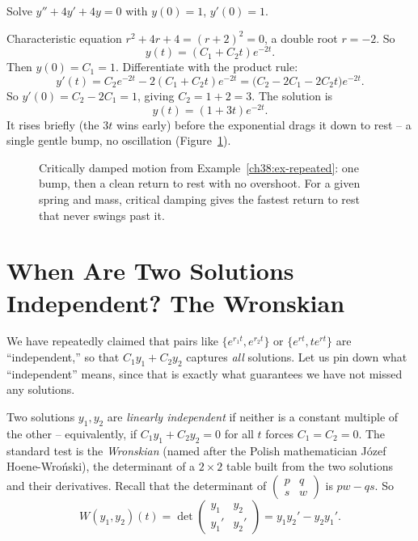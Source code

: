 \begin{example}
\label{ch38:ex-repeated}
Solve $y'' + 4y' + 4y = 0$ with $y(0) = 1$, $y'(0) = 1$.

Characteristic equation $r^2 + 4r + 4 = (r+2)^2 = 0$, a double root $r = -2$. So
\[
  y(t) = (C_1 + C_2 t)e^{-2t}.
\]
Then $y(0) = C_1 = 1$. Differentiate with the product rule:
\[
  y'(t) = C_2 e^{-2t} - 2(C_1 + C_2 t)e^{-2t} = \big(C_2 - 2C_1 - 2 C_2 t\big)e^{-2t}.
\]
So $y'(0) = C_2 - 2C_1 = 1$, giving $C_2 = 1 + 2 = 3$. The solution is
\[
  y(t) = (1 + 3t)e^{-2t}.
\]
It rises briefly (the $3t$ wins early) before the exponential drags it
down to rest -- a single gentle bump, no oscillation
(Figure~\ref{ch38:fig-critical}).
\end{example}

\begin{figure}[htbp]
\centering
{}
\caption{Critically damped motion from Example~\ref{ch38:ex-repeated}: one bump,
then a clean return to rest with no overshoot. For a given spring and mass,
critical damping gives the fastest return to rest that never swings past it.}
\label{ch38:fig-critical}
\end{figure}

\section{When Are Two Solutions Independent? The Wronskian}
\label{ch38:wronskian}

We have repeatedly claimed that pairs like $\{e^{r_1 t}, e^{r_2 t}\}$ or
$\{e^{rt}, t e^{rt}\}$ are ``independent,'' so that $C_1 y_1 + C_2 y_2$ captures
\emph{all} solutions. Let us pin down what ``independent'' means, since that is
exactly what guarantees we have not missed any solutions.

Two solutions $y_1, y_2$ are \emph{linearly independent} if neither is a constant
multiple of the other -- equivalently, if $C_1 y_1 + C_2 y_2 = 0$ for all $t$
forces $C_1 = C_2 = 0$. The standard test is the \emph{Wronskian} (named after
the Polish mathematician J\'ozef Hoene-Wro\'nski), the determinant of a
$2\times 2$ table built from the two solutions and their derivatives. Recall
that the determinant of $\begin{pmatrix} p & q \\ s & w \end{pmatrix}$ is
$pw - qs$. So
\[
  W(y_1, y_2)(t) = \det\begin{pmatrix} y_1 & y_2 \\ y_1' & y_2' \end{pmatrix}
  = y_1 y_2' - y_2 y_1'.
\]

